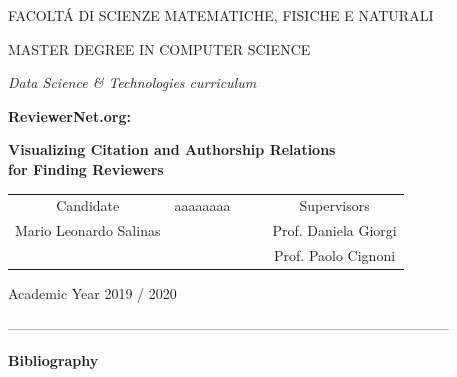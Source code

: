 \documentclass[11pt,a4paper,openany,oneside]{book}
\theoremstyle{definition}
\begin{document}
	\begin{Large}
		\begin{center}
			FACOLT\'A DI SCIENZE MATEMATICHE, FISICHE E NATURALI
			\vspace{1.5cm}


			MASTER DEGREE IN COMPUTER SCIENCE
			
			\textit{Data Science \& Technologies curriculum}
			\vspace{2.5cm}


			\textbf{ReviewerNet.org:}


			\textbf{Visualizing Citation and Authorship Relations\\for Finding Reviewers}
			\vspace{1.5cm}
			\begin{table}[h!]
				\centering
				\label{my-label}
				\begin{tabular}{ccccc}
					Candidate              & {\color{white} aaaaaaaa} &  &  & Supervisors                 					\\Mario Leonardo Salinas &                                             &  &  						& Prof. Daniela Giorgi \\
				   &                                             &  &  &  Prof. Paolo Cignoni \\
				                           

				\end{tabular}
			\end{table}
		\end{center}
	\end{Large}
	\vspace{0.5cm}
	\begin{normalsize}
		\begin{center}
			Academic Year 2019 / 2020
		\end{center}
	\end{normalsize}	
\newpage
	\cleardoublepage
	\tableofcontents
	\begin{normalsize}
-----------------------------------------------------------------------------------------------
	\end{normalsize}
	\textbf{Bibliography}
	
\end{document}
